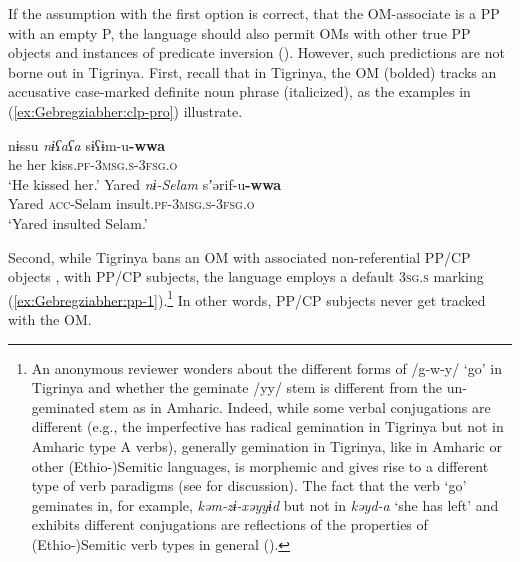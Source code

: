 \documentclass[output=paper]{langscibook}
\begin{document}
If the assumption with the first option is correct, that the OM-associate is a PP with an empty P, the language should also permit OMs with other true PP objects and instances of predicate inversion (\citealt{denDikken2006}).
However, such predictions are not borne out in Tigrinya.
First, recall that in Tigrinya, the OM (bolded) tracks an accusative case-marked definite noun phrase (italicized), as the examples in (\ref{ex:Gebregziabher:clp-pro}) illustrate. 

\ea \label{ex:Gebregziabher:clp-pro}
   \ea \gll nɨssu \textit{nɨʕaʕa} sɨʕɨm-u{\textbf{-wwa}}\\
   he her kiss.{\scshape pf-3msg.s-3fsg.o}\\
   \glt `He kissed her.' 
   \ex \gll Yared \textit{nɨ-Selam} sʼərif-u{\textbf{-wwa}}\\
   Yared {\scshape acc}-Selam insult.{\scshape pf-3msg.s-3fsg.o}\\
   \glt `Yared insulted Selam.'
   \z
\z

Second, while Tigrinya bans an OM with associated non-referential PP/CP objects , with PP/CP subjects, the language employs a default {\scshape 3sg.s} marking (\ref{ex:Gebregziabher:pp-1}).\footnote{An anonymous reviewer wonders about the different forms of /g-w-y/ `go' in Tigrinya and whether the geminate /yy/ stem is different from the un-geminated stem as in Amharic. Indeed, while some verbal conjugations are different (e.g., the imperfective has radical gemination in Tigrinya but not in Amharic type A verbs), generally gemination in Tigrinya, like in Amharic or other (Ethio-)Semitic languages, is morphemic and gives rise to a different type of verb paradigms (see \citealt{berhane91} for discussion). The fact that the verb `go' geminates in, for example, \emph{kəm-zɨ-xəyyɨd} but not in \emph{kəyd-a} `she has left' and exhibits different conjugations are reflections of the properties of (Ethio-)Semitic verb types in general (\citealt{hetzron1972}).} In other words, PP/CP subjects never get tracked with the OM.
\end{document}
